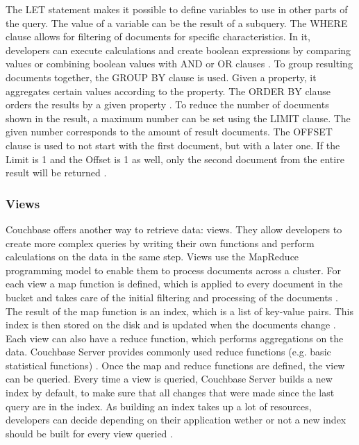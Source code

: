 The LET statement makes it possible to define variables to use in other parts of the query. The value of a variable can be the result of a subquery. The WHERE clause allows for filtering of documents for specific characteristics. In it, developers can execute calculations and create boolean expressions by comparing values or combining boolean values with AND or OR clauses \parencite{couchbaseDocN1Ql}. To group resulting documents together, the GROUP BY clause is used. Given a property, it aggregates certain values according to the property. The ORDER BY clause orders the results by a given property \parencite{proCouchbaseServer}. To reduce the number of documents shown in the result, a maximum number can be set using the LIMIT clause. The given number corresponds to the amount of result documents. The OFFSET clause is used to not start with the first document, but with a later one. If the Limit is 1 and the Offset is 1 as well, only the second document from the entire result will be returned \parencite{proCouchbaseDev}.
\subsubsection{Views}
Couchbase offers another way to retrieve data: views. They allow developers to create more complex queries by writing their own functions and perform calculations on the data in the same step. Views use the MapReduce programming model to enable them to process documents across a cluster. For each view a map function is defined, which is applied to every document in the bucket and takes care of the initial filtering and processing of the documents \parencite{proCouchbaseServer}. The result of the map function is an index, which is a list of key-value pairs. This index is then stored on the disk and is updated when the documents change \parencite{couchbaseDocViews}. Each view can also have a reduce function, which performs aggregations on the data. Couchbase Server provides commonly used reduce functions (e.g. basic statistical functions) \parencite{proCouchbaseServer}. Once the map and reduce functions are defined, the view can be queried. Every time a view is queried, Couchbase Server builds a new index by default, to make sure that all changes that were made since the last query are in the index. As building an index takes up a lot of resources, developers can decide depending on their application wether or not a new index should be built for every view queried \parencite{couchbaseDocViews}.


